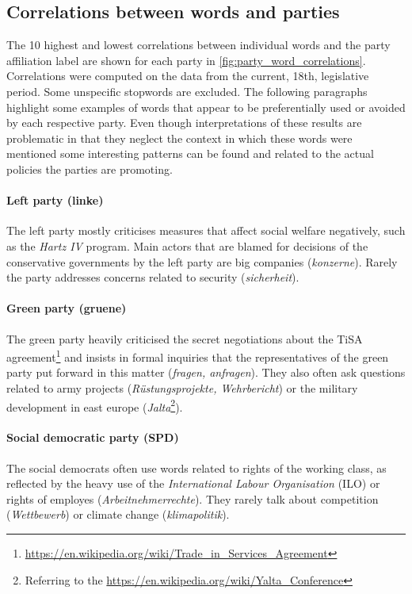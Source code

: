 \documentclass[runningheads,a4paper]{llncs}
\begin{document}
\subsection{Correlations between words and parties}\label{sec:word_party_correlations}

The 10 highest and lowest correlations between individual words and the party affiliation label are shown for each party in \autoref{fig:party_word_correlations}. Correlations were computed on the data from the current, 18th, legislative period. Some unspecific stopwords are excluded. 
The following paragraphs highlight some examples of words that appear to be preferentially used or avoided by each respective party. Even though interpretations of these results are problematic in that they neglect the context in which these words were mentioned some interesting patterns can be found and related to the actual policies the parties are promoting. 
\paragraph{\bf Left party (linke)}
The left party mostly criticises measures that affect social welfare negatively, such as the {\em Hartz IV} program. Main actors that are blamed for decisions of the conservative governments by the left party are big companies ({\em konzerne}). Rarely the party addresses concerns related to security ({\em sicherheit}). 
\paragraph{\bf Green party (gruene)}
The green party heavily criticised the secret negotiations about the TiSA agreement\footnote{\url{https://en.wikipedia.org/wiki/Trade_in_Services_Agreement}} and insists in formal inquiries that the representatives of the green party put forward in this matter ({\em fragen, anfragen}). They also often ask questions related to army projects ({\em R\"ustungsprojekte, Wehrbericht}) or the military development in east europe ({\em  Jalta}\footnote{Referring to the \url{https://en.wikipedia.org/wiki/Yalta_Conference}}).
\paragraph{\bf Social democratic party (SPD)}
The social democrats often use words related to rights of the working class, as reflected by the heavy use of the {\em International Labour Organisation} (ILO) or rights of employes ({\em Arbeitnehmerrechte}). They rarely talk about competition ({\em Wettbewerb}) or climate change ({\em klimapolitik}). 
\end{document}
